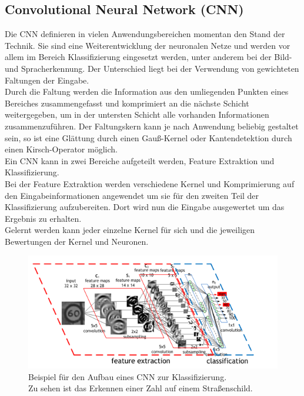 \subsection{Convolutional Neural Network (CNN)}
Die CNN definieren in vielen Anwendungsbereichen momentan den Stand der Technik. Sie sind eine Weiterentwicklung der neuronalen Netze und werden vor allem im Bereich Klassifizierung eingesetzt werden, unter anderem bei der Bild- und Spracherkennung. Der Unterschied liegt bei der Verwendung von gewichteten Faltungen der Eingabe.\\
Durch die Faltung werden die Information aus den umliegenden Punkten eines Bereiches zusammengefasst und komprimiert an die nächste Schicht weitergegeben, um in der untersten Schicht alle vorhanden Informationen zusammenzuführen. Der Faltungskern kann je nach Anwendung beliebig gestaltet sein, so ist eine Glättung durch einen Gauß-Kernel oder Kantendetektion durch einen Kirsch-Operator möglich.\\
Ein CNN kann in zwei Bereiche aufgeteilt werden, Feature Extraktion und Klassifizierung.\\
Bei der Feature Extraktion werden verschiedene Kernel und Komprimierung auf den Eingabeinformationen angewendet um sie für den zweiten Teil der Klassifizierung aufzubereiten. Dort wird nun die Eingabe ausgewertet um das Ergebnis zu erhalten.\\
Gelernt werden kann jeder einzelne Kernel für sich und die jeweiligen Bewertungen der Kernel und Neuronen.\\
\cite{pdf_CNN}\cite{wiki_CNN}
\begin{figure}
	\centering
	\includegraphics[width=0.9\linewidth]{img/cnn}
	\caption{Beispiel für den Aufbau eines CNN zur Klassifizierung.\\Zu sehen ist das Erkennen einer Zahl auf einem Straßenschild.\cite{bild_CNN}}
	\label{img_cnn}
\end{figure}
